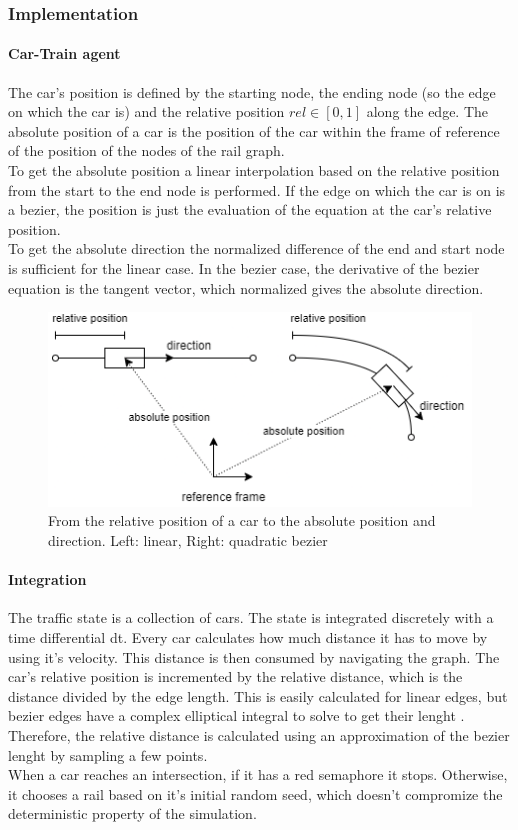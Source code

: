 \documentclass[12pt]{article}
\begin{document}
\subsubsection{Implementation}
\paragraph{Car-Train agent}
The car's position is defined by the starting node, the ending node (so the edge on which the car is) and the relative position \begin{math}{rel \in [0, 1]}\end{math} along the edge. The absolute position of a car is the position of the car within the frame of reference of the position of the nodes of the rail graph.\\
To get the absolute position a linear interpolation based on the relative position from the start to the end node is performed. If the edge on which the car is on is a bezier, the position is just the evaluation of the equation at the car's relative position.\\
To get the absolute direction the normalized difference of the end and start node is sufficient for the linear case. In the bezier case, the derivative of the bezier equation is the tangent vector, which normalized gives the absolute direction.
\begin{figure}[H]
\includegraphics[width=\textwidth]{abspos}
\caption{From the relative position of a car to the absolute position and direction. Left: linear, Right: quadratic bezier}
\end{figure}

\paragraph{Integration}
The traffic state is a collection of cars. The state is integrated discretely with a time differential dt. Every car calculates how much distance it has to move by using it's velocity. This distance is then consumed by navigating the graph. The car's relative position is incremented by the relative distance, which is the distance divided by the edge length. This is easily calculated for linear edges, but bezier edges have a complex elliptical integral to solve to get their lenght \cite{bezier}. Therefore, the relative distance is calculated using an approximation of the bezier lenght by sampling a few points. \\
When a car reaches an intersection, if it has a red semaphore it stops. Otherwise, it chooses a rail based on it's initial random seed, which doesn't compromize the deterministic property of the simulation.
\end{document}
